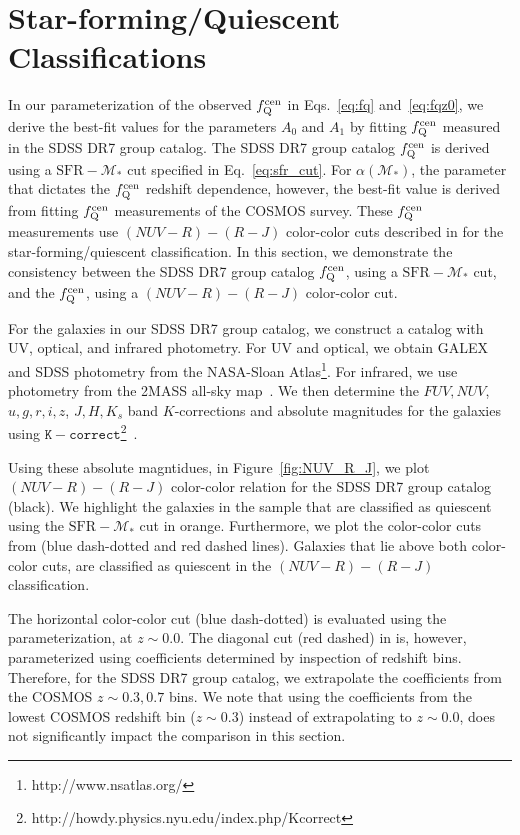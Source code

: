 \chapter{Star-forming/Quiescent Classifications \label{chap:append3}}

In our parameterization of the observed $f_\mathrm{Q}^\mathrm{cen}$ in Eqs.~\ref{eq:fq} and~\ref{eq:fqz0}, 
we derive the best-fit values for the parameters $A_0$ and $A_1$ by fitting 
$f_\mathrm{Q}^\mathrm{cen}$ measured in the SDSS DR7 group catalog. The SDSS DR7 group catalog 
$f_\mathrm{Q}^\mathrm{cen}$ is derived using a $\mathrm{SFR} - \mathcal{M}_*$ cut 
specified in Eq.~\ref{eq:sfr_cut}. For $\alpha(\mathcal{M}_*)$, the 
parameter that dictates the $f_\mathrm{Q}^\mathrm{cen}$ redshift dependence, however, 
the best-fit value is derived from fitting \cite{Tinker:2013aa} 
$f_\mathrm{Q}^\mathrm{cen}$ measurements of the COSMOS survey. These $f_\mathrm{Q}^\mathrm{cen}$ measurements 
use $(NUV - R) - (R - J)$ color-color cuts described in 
\cite{Bundy:2010aa} for the star-forming/quiescent classification. 
In this section, we demonstrate the consistency between the SDSS 
DR7 group catalog $f_\mathrm{Q}^\mathrm{cen}$, using a $\mathrm{SFR} - \mathcal{M}_*$ 
cut, and the \cite{Tinker:2013aa} $f_\mathrm{Q}^\mathrm{cen}$, using a $(NUV - R) - (R - J)$ 
color-color cut.

For the galaxies in our SDSS DR7 group catalog, we construct a catalog
with UV, optical, and infrared photometry. For UV and optical, 
we obtain GALEX and SDSS photometry from the NASA-Sloan Atlas\footnote{http://www.nsatlas.org/}.
For infrared, we use photometry from the 2MASS all-sky map~\citep{Cutri:2000aa}. 
We then determine the $FUV, NUV$, $u, g, r, i, z$, $J, H, K_s$ 
band $K$-corrections and absolute magnitudes for the galaxies 
using $\mathtt{K-correct}$\footnote{http://howdy.physics.nyu.edu/index.php/Kcorrect}~\citep[v4.2][]{Blanton:2007aa}. 

Using these absolute magntidues, in Figure~\ref{fig:NUV_R_J}, we 
plot $(NUV-R) - (R-J)$ color-color relation for the SDSS DR7 group 
catalog (black). We highlight the galaxies in the sample that are 
classified as quiescent using the $\mathrm{SFR} - \mathcal{M}_*$
cut in orange. Furthermore, we plot the color-color cuts from 
\cite{Bundy:2010aa} (blue dash-dotted and red dashed lines). 
Galaxies that lie above both color-color cuts, are classified as 
quiescent in the $(NUV-R) - (R-J)$ classification. 

The horizontal color-color cut (blue dash-dotted) is evaluated
using the \cite{Bundy:2010aa} parameterization, at $z \sim 0.0$. The 
diagonal cut (red dashed) in \cite{Bundy:2010aa} is, however, 
parameterized using coefficients determined by inspection of 
redshift bins. Therefore, for the SDSS DR7 group catalog, we 
extrapolate the coefficients from the COSMOS $z \sim 0.3, 0.7$ 
bins. We note that using the coefficients from the lowest COSMOS 
redshift bin ($z \sim 0.3$) instead of extrapolating to $z \sim 0.0$,
does not significantly impact the comparison in this section. 


